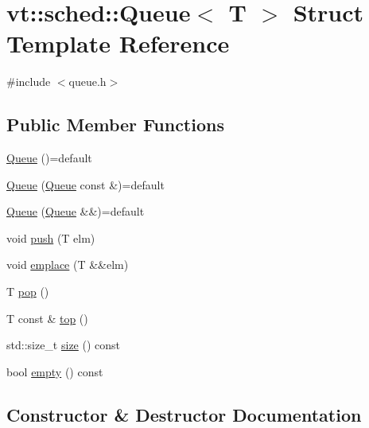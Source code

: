 \hypertarget{structvt_1_1sched_1_1_queue}{}\section{vt\+:\+:sched\+:\+:Queue$<$ T $>$ Struct Template Reference}
\label{structvt_1_1sched_1_1_queue}


{\ttfamily \#include $<$queue.\+h$>$}

\subsection*{Public Member Functions}
\begin{DoxyCompactItemize}
\item 
\hyperlink{structvt_1_1sched_1_1_queue_a5bca57d5a8c3bb7bfb30ed1bc634c29f}{Queue} ()=default
\item 
\hyperlink{structvt_1_1sched_1_1_queue_a718cecfdd0b3fa8ec80fe4768e153467}{Queue} (\hyperlink{structvt_1_1sched_1_1_queue}{Queue} const \&)=default
\item 
\hyperlink{structvt_1_1sched_1_1_queue_a0a85a456ebc179a2f7ab77369566eb5c}{Queue} (\hyperlink{structvt_1_1sched_1_1_queue}{Queue} \&\&)=default
\item 
void \hyperlink{structvt_1_1sched_1_1_queue_a5079f0b8b665ec528767a12ab210d1be}{push} (T elm)
\item 
void \hyperlink{structvt_1_1sched_1_1_queue_a5b99b53786540fdff718540010fecb1b}{emplace} (T \&\&elm)
\item 
T \hyperlink{structvt_1_1sched_1_1_queue_ad5e435489eb04cd78a2da6acfa855331}{pop} ()
\item 
T const  \& \hyperlink{structvt_1_1sched_1_1_queue_a636c676d2dc99d283ba3607e7ed5b390}{top} ()
\item 
std\+::size\+\_\+t \hyperlink{structvt_1_1sched_1_1_queue_a0d5cd0a31703541be21f3bbd1590464e}{size} () const
\item 
bool \hyperlink{structvt_1_1sched_1_1_queue_a499b45b0a8c55731b09885dbd28882a8}{empty} () const
\end{DoxyCompactItemize}


\subsection{Constructor \& Destructor Documentation}
\mbox{\label{structvt_1_1sched_1_1_queue_a5bca57d5a8c3bb7bfb30ed1bc634c29f}} 
